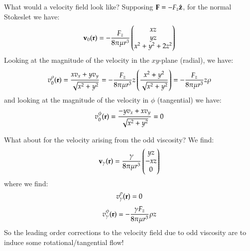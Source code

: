 What would a velocity field look like? Supposing $\mathbf{F} = -F_z\hat{\mathbf{z}}$, for the normal Stokeslet we have:
\begin{equation}
    \mathbf{v}_0(\mathbf{r}) = -\frac{F_z}{8\pi\mu r^3}\begin{pmatrix}xz \\ yz \\ x^2 + y^2 + 2z^2\end{pmatrix}
\end{equation}
Looking at the magnitude of the velocity in the $xy$-plane (radial), we have:
\begin{equation}
    v^\rho_0(\mathbf{r}) = \frac{xv_x + yv_y}{\sqrt{x^2 + y^2}} = -\frac{F_z}{8\pi \mu r^3}z\left(\frac{x^2 + y^2}{\sqrt{x^2 + y^2}}\right) = -\frac{F_z}{8\pi \mu r^3}z\rho
\end{equation}
and looking at the magnitude of the velocity in $\phi$ (tangential) we have:
\begin{equation}
    v^\phi_0(\mathbf{r}) = \frac{-yv_x + xv_y}{\sqrt{x^2 + y^2}} = 0
\end{equation}

What about for the velocity arising from the odd viscosity? We find:
\begin{equation}
    \mathbf{v}_\gamma(\mathbf{r}) = \frac{\gamma}{8\pi \mu r^3}\begin{pmatrix}yz \\ -xz \\ 0\end{pmatrix}
\end{equation}
where we find:
\begin{equation}
    v^\rho_\gamma(\mathbf{r}) = 0
\end{equation}
\begin{equation}
    v^\phi_\gamma(\mathbf{r}) = -\frac{\gamma F_z}{8\pi \mu r^3}\rho z
\end{equation}
So the leading order corrections to the velocity field due to odd viscosity are to induce some rotational/tangential flow!

